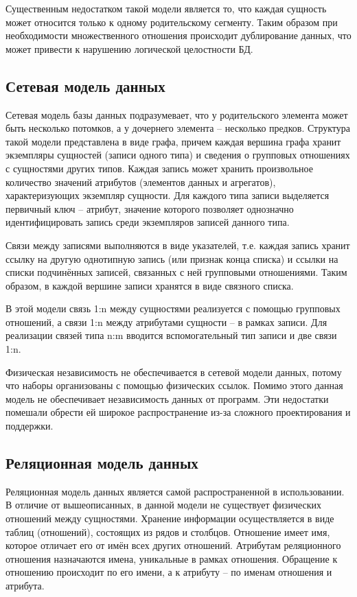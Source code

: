 Существенным недостатком такой модели является то, что каждая сущность может относится только к одному родительскому сегменту. Таким образом при необходимости множественного отношения происходит дублирование данных, что может привести к нарушению логической целостности БД.

\subsection{Сетевая модель данных}

Сетевая модель базы данных подразумевает, что у родительского элемента может быть несколько потомков, а у дочернего элемента -- несколько предков. Структура такой модели представлена в виде графа, причем каждая вершина графа хранит экземпляры сущностей (записи одного типа) и сведения о групповых отношениях с сущностями других типов. Каждая запись может хранить произвольное количество значений атрибутов (элементов данных и агрегатов), характеризующих экземпляр сущности. Для каждого типа записи выделяется первичный ключ – атрибут, значение которого позволяет однозначно идентифицировать запись среди экземпляров записей данного типа.

Связи между записями выполняются в виде указателей, т.е. каждая запись хранит ссылку на другую однотипную запись (или признак конца списка) и ссылки на списки подчинённых записей, связанных с ней групповыми отношениями. Таким образом, в каждой вершине записи хранятся в виде связного списка.

В этой модели связь 1:n между сущностями реализуется с помощью групповых отношений, а связи 1:n между атрибутами сущности -- в рамках записи. Для реализации связей типа n:m вводится вспомогательный тип записи и две связи 1:n. 

Физическая независимость не обеспечивается в сетевой модели данных, потому что наборы организованы с помощью физических ссылок. Помимо этого данная модель не обеспечивает независимость данных от программ. Эти недостатки помешали обрести ей широкое распространение из-за сложного проектирования и поддержки.

\subsection{Реляционная модель данных}

Реляционная модель данных является самой распространенной в использовании. В отличие от вышеописанных, в данной модели не существует физических отношений между сущностями. Хранение информации осуществляется в виде таблиц (отношений), состоящих из рядов и столбцов. Отношение имеет имя, которое отличает его от имён всех других отношений. Атрибутам реляционного отношения назначаются имена, уникальные в рамках отношения. Обращение к отношению происходит по его имени, а к атрибуту – по именам отношения и атрибута.


